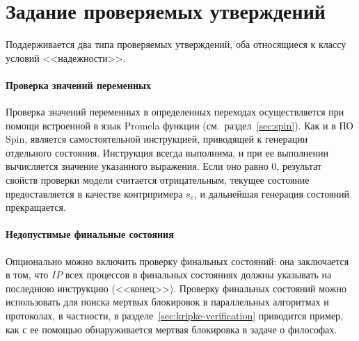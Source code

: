 \section{Задание проверяемых утверждений}
\label{sec:assertions}

Поддерживается два типа проверяемых утверждений, оба относящиеся к классу условий
<<надежности>>.

\paragraph{Проверка значений переменных}
\label{sec:pml-assert}

Проверка значений переменных в определенных переходах осуществляется при помощи встроенной
в язык Promela функции  (см.~раздел~\ref{sec:spin}). Как и в ПО Spin,
 является самостоятельной инструкцией, приводящей к генерации отдельного
состояния. Инструкция  всегда выполнима, и при ее выполнении вычисляется
значение указанного выражения. Если оно равно $0$, результат свойств проверки модели
считается отрицательным, текущее состояние предоставляется в качестве контрпримера $s_e$,
и дальнейшая генерация состояний прекращается.

\paragraph{Недопустимые финальные состояния}
\label{sec:pml-endstates}

Опционально можно включить проверку финальных состояний: она заключается в том, что $IP$
всех процессов в финальных состояниях должны указывать на последнюю инструкцию
(<<конец>>). Проверку финальных состояний можно использовать для поиска мертвых блокировок
в параллельных алгоритмах и протоколах, в частности, в разделе~\ref{sec:kripke-verification}
приводится пример, как с ее помощью обнаруживается мертвая блокировка в задаче о
философах.




